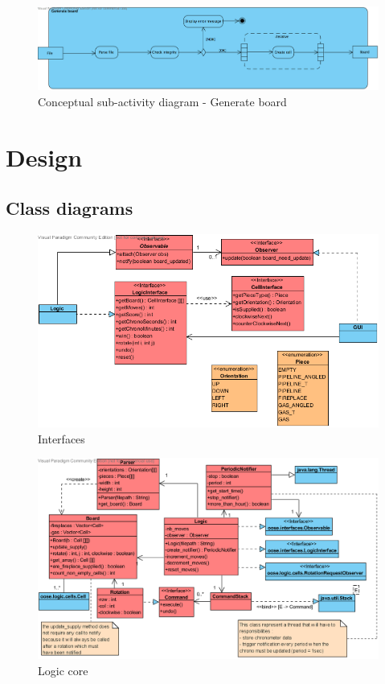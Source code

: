 \documentclass[a4paper,11pt]{article}
\begin{document}
\begin{figure}[h]
	\center
	\includegraphics[angle=90,scale=0.7]{Generate-board.png}
	\caption{Conceptual sub-activity diagram - Generate board}
	\label{fig:concept-generate-board}
\end{figure}

\section{Design}
\subsection{Class diagrams}
\begin{figure}[h]
	\center
	\includegraphics[angle=90,scale=1]{interfaces.png}
	\caption{Interfaces}
	\label{fig:inter}
\end{figure}
\begin{figure}[h]
	\center
	\includegraphics[angle=90,scale=1]{logic.png}
	\caption{Logic core}
	\label{fig:logic}
\end{figure}
\end{document}
